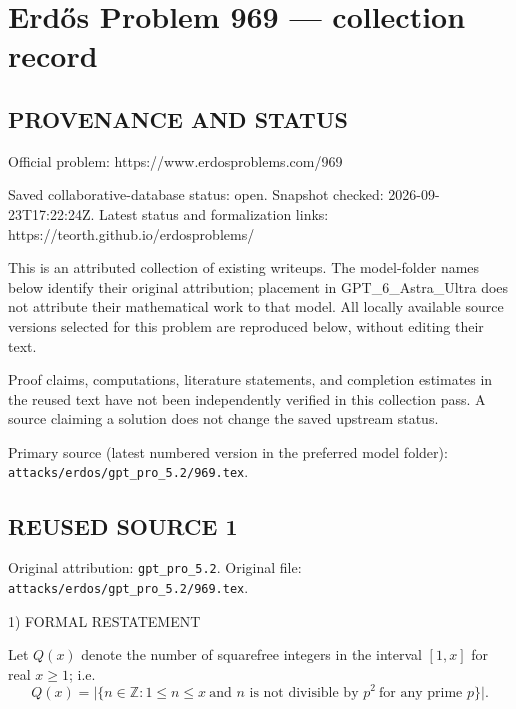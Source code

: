 \section*{Erd\H{o}s Problem 969 --- collection record}

\subsection*{PROVENANCE AND STATUS}
Official problem: https://www.erdosproblems.com/969

Saved collaborative-database status: open.
Snapshot checked: 2026-09-23T17:22:24Z.
Latest status and formalization links: https://teorth.github.io/erdosproblems/

This is an attributed collection of existing writeups. The model-folder names below identify their original attribution; placement in GPT\_6\_Astra\_Ultra does not attribute their mathematical work to that model. All locally available source versions selected for this problem are reproduced below, without editing their text.

Proof claims, computations, literature statements, and completion estimates in the reused text have not been independently verified in this collection pass. A source claiming a solution does not change the saved upstream status.

Primary source (latest numbered version in the preferred model folder): \texttt{attacks/erdos/gpt\_pro\_5.2/969.tex}.

\subsection*{REUSED SOURCE 1}
Original attribution: \texttt{gpt\_pro\_5.2}.
Original file: \texttt{attacks/erdos/gpt\_pro\_5.2/969.tex}.


1) FORMAL RESTATEMENT

Let $Q(x)$ denote the number of squarefree integers in the interval $[1,x]$ for real $x\ge 1$; i.e.
\[
Q(x)=\bigl|\{n\in\mathbb Z: 1\le n\le x\ \text{and } n \text{ is not divisible by } p^2\ \text{for any prime }p\}\bigr|.
\]

